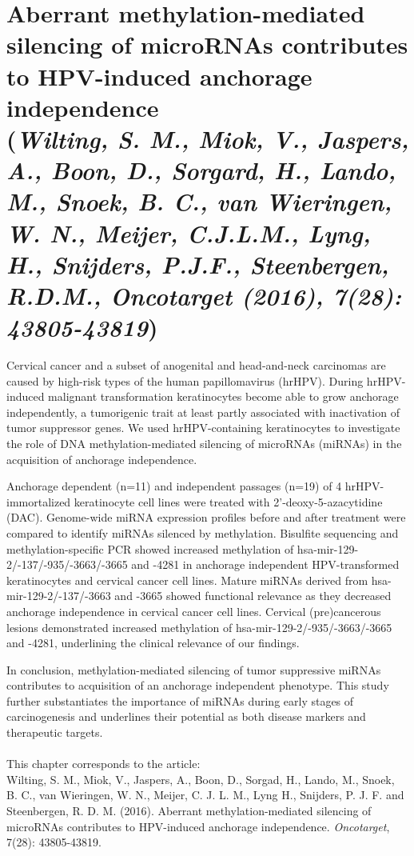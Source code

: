 \chapter{Aberrant methylation-mediated silencing of microRNAs contributes to HPV-induced anchorage independence \\ {\footnotesize (\textit{Wilting, S. M., Miok, V., Jaspers, A., Boon, D., Sorgard, H., Lando, M., Snoek, B. C., van Wieringen, W. N., Meijer, C.J.L.M., Lyng, H., Snijders, P.J.F., Steenbergen, R.D.M., Oncotarget (2016), 7(28): 43805-43819})}}
\label{chapter:Window estimator}

\graphicspath{{Chapte6/Figs/}{Chapter6/Figs/PDF/}{Chapter6/Figs/}}%

Cervical cancer and a subset of anogenital and head-and-neck carcinomas are caused by high-risk types of the human papillomavirus (hrHPV). During hrHPV-induced malignant transformation keratinocytes become able to grow anchorage independently, a tumorigenic trait at least partly associated with inactivation of tumor suppressor genes. We used hrHPV-containing keratinocytes to investigate the role of DNA methylation-mediated silencing of microRNAs (miRNAs) in the acquisition of anchorage independence.

Anchorage dependent (n=11) and independent passages (n=19) of 4 hrHPV-immortalized keratinocyte cell lines were treated with 2'-deoxy-5-azacytidine (DAC). Genome-wide miRNA expression profiles before and after treatment were compared to identify miRNAs silenced by methylation. Bisulfite sequencing and methylation-specific PCR showed increased methylation of hsa-mir-129-2/-137/-935/-3663/-3665 and -4281 in anchorage independent HPV-transformed keratinocytes and cervical cancer cell lines. Mature miRNAs derived from hsa-mir-129-2/-137/-3663 and -3665 showed functional relevance as they decreased anchorage independence in cervical cancer cell lines. Cervical (pre)cancerous lesions demonstrated increased methylation of hsa-mir-129-2/-935/-3663/-3665 and -4281, underlining the clinical relevance of our findings.  

In conclusion, methylation-mediated silencing of tumor suppressive miRNAs contributes to acquisition of an anchorage independent phenotype. This study further substantiates the importance of miRNAs during early stages of carcinogenesis and underlines their potential as both disease markers and therapeutic targets.
\\
\\
This chapter corresponds to the article:\\
 Wilting, S. M., Miok, V., Jaspers, A., Boon, D., Sorgad, H., Lando, M., Snoek, B. C., van Wieringen, W. N., Meijer, C. J. L. M., Lyng H., Snijders, P. J. F. and Steenbergen, R. D. M. (2016). Aberrant methylation-mediated silencing of microRNAs contributes to HPV-induced anchorage independence. \textit{Oncotarget}, 7(28): 43805-43819.

